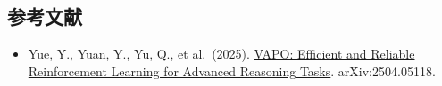 \FloatBarrier
{}
\hypertarget{ux53c2ux8003ux6587ux732e-110}{%
\subsection{参考文献}\label{ux53c2ux8003ux6587ux732e-110}}

\vspace{0.25em}
\begin{itemize}
\tightlist
\item
  Yue, Y., Yuan, Y., Yu, Q., et al.~(2025). \href{https://arxiv.org/abs/2504.05118}{VAPO: Efficient and Reliable Reinforcement Learning for Advanced Reasoning Tasks}. arXiv:2504.05118.
\end{itemize}

\clearpage
